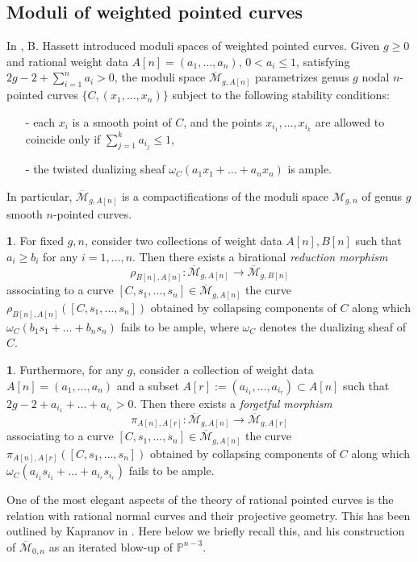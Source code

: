 \documentclass[a4paper,10pt]{amsart}
\theoremstyle{definition}
\newtheorem{say}[thm]{}
\renewcommand{\P}{\mathbb{P}}
\newcommand{\cM}{\overline{\mathcal{M}}}
\begin{document}
\subsection{Moduli of weighted pointed curves}
In \cite{Ha}, B. Hassett introduced moduli spaces of weighted pointed curves. 
Given $g\geq 0$ and rational weight data  $A[n] = (a_{1},\dots,a_{n})$, $0< a_{i}\leq 1$, satisfying $2g-2 + \sum_{i = 1}^{n}a_{i} > 0$,
the moduli space $\cM_{g,A[n]}$ parametrizes  genus $g$ nodal $n$-pointed curves $\{C,(x_1,\dots,x_n)\}$ 
subject to the following stability conditions:
\begin{itemize}
\item[-] each $x_i$ is a smooth point of $C$, and the points $x_{i_1}, \dots,  x_{i_k}$ are allowed to coincide only if $\sum_{j= 1}^{k}a_{i_j}\leq 1$,
\item[-] the twisted dualizing sheaf $\omega_C(a_{1}x_1 +\dots + a_{n}x_n)$ is ample. 
\end{itemize}
In particular,  $\cM_{g,A[n]}$ is a compactifications of the moduli space $\mathcal{M}_{g,n}$ of genus $g$ smooth $n$-pointed curves. 

\begin{say}\label{reduction}
For fixed $g,n$, consider two collections of weight data $A[n],B[n]$ such that $a_i\geq b_i$ for any $i = 1,\dots,n$. Then there exists a birational \textit{reduction morphism}
$$\rho_{B[n],A[n]}:\cM_{g,A[n]}\rightarrow\cM_{g,B[n]}$$
associating to a curve $[C,s_1,\dots,s_n]\in\cM_{g,A[n]}$ the curve $\rho_{B[n],A[n]}([C,s_1,\dots,s_n])$ obtained by collapsing components of $C$ along which $\omega_C(b_1s_1+\dots+b_ns_n)$ fails to be ample, where $\omega_C$ denotes the dualizing sheaf of $C$.
\end{say}

\begin{say}\label{forgetful}
Furthermore, for any $g$, consider a collection of weight data $A[n]=(a_1,\dots,a_n)$ and a subset $A[r]:=(a_{i_{1}},\dots,a_{i_{r}})\subset A[n]$ such that $2g-2+a_{i_{1}}+\dots+a_{i_{r}}>0$. Then there exists a \textit{forgetful morphism} 
$$\pi_{A[n],A[r]}:\cM_{g,A[n]}\rightarrow\cM_{g,A[r]}$$
associating to a curve $[C,s_1,\dots,s_n]\in\cM_{g,A[n]}$ the curve $\pi_{A[n],A[r]}([C,s_1,\dots,s_n])$ obtained by collapsing components of $C$ along which $\omega_C(a_{i_{1}}s_{i_{1}}+\dots+a_{i_{r}}s_{i_{r}})$ fails to be ample.
\end{say}
One of the most elegant aspects of the theory of rational pointed curves is the relation with rational normal curves and their projective geometry. This has been outlined by Kapranov in \cite{Ka}. Here below we briefly recall this, and his construction of $\cM_{0,n}$ as an iterated blow-up of $\P^{n-3}$.
\end{document}
